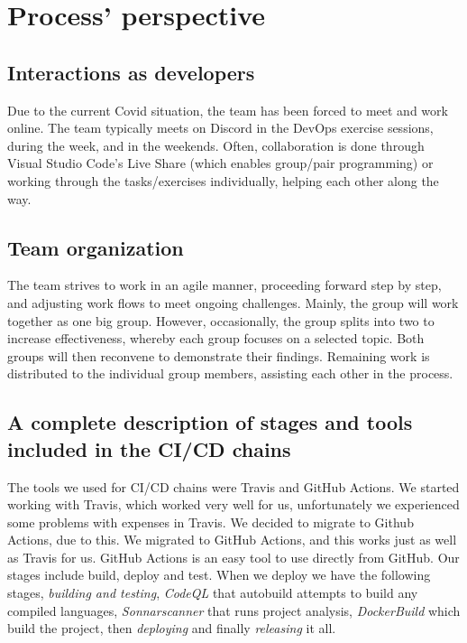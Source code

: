 \section{Process' perspective}

\subsection{Interactions as developers}
  Due to the current Covid situation, the team has been forced to meet and work online. The team typically meets on Discord in the DevOps
  exercise sessions, during the week, and in the weekends. Often, collaboration is done through Visual Studio Code's Live Share (which enables group/pair programming) or working through the tasks/exercises individually, helping each other along the way. 
  \newline
 
\subsection{Team organization}
  The team strives to work in an agile manner, proceeding forward step by step, and adjusting work flows to meet ongoing challenges. Mainly, the group will work together as one big group. 
  However, occasionally, the group splits into two to increase effectiveness, whereby each group focuses on a selected topic. Both groups will then reconvene to demonstrate their findings. Remaining work is distributed to the individual group members, assisting each other in the process.

\subsection{A complete description of stages and tools included in the CI/CD chains}
The tools we used for CI/CD chains were Travis and GitHub Actions. We started working with Travis, which worked very well for us, unfortunately we experienced some problems with expenses in Travis. We decided to migrate to Github Actions, due to this.
We migrated to GitHub Actions, and this works just as well as Travis for us. GitHub Actions is an easy tool to use directly from GitHub. 
Our stages include build, deploy and test. When we deploy we have the following stages, \textit{building and testing}, \textit{CodeQL} that autobuild attempts to build any compiled languages, \textit{Sonnarscanner} that runs project analysis, \textit{DockerBuild} which build the project, then \textit{deploying} and finally \textit{releasing} it all.\newline
 
